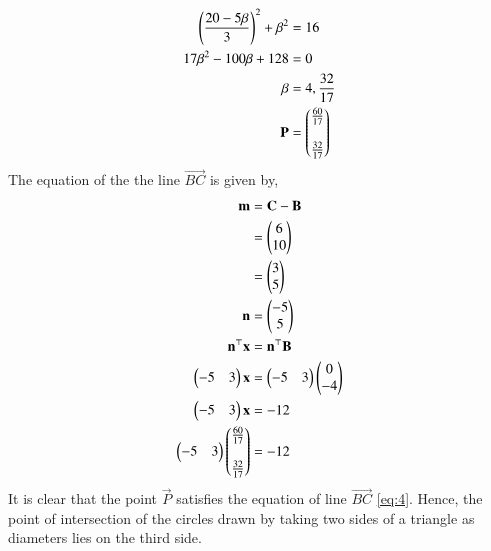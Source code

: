 \documentclass[journal,12pt,twocolumn]{IEEEtran}
\begin{document}
\begin{enumerate}
\begin{align}
\left(\frac{20-5\beta}{3}\right)^2 + \beta^2 &= 16\\
17\beta^2-100\beta+128 &= 0\\
\beta &= 4, \frac{32}{17}\\
\mathbf{P} &= \begin{pmatrix}\frac{60}{17}\\\\\frac{32}{17}\end{pmatrix}
\end{align}
The equation of the the line $\vec{BC}$ is given by,
\begin{align}
\mathbf{m} &= \mathbf{C}-\mathbf{B}\\
&= \begin{pmatrix}6\\10\end{pmatrix}\\
&= \begin{pmatrix}3\\5\end{pmatrix}\\
\mathbf{n} &= \begin{pmatrix}-5\\5\end{pmatrix}\\
\mathbf{n}^\top\mathbf{x} &= \mathbf{n}^\top\mathbf{B}\\
\begin{pmatrix}-5&3\end{pmatrix}\mathbf{x} &= \begin{pmatrix}-5&3\end{pmatrix}\begin{pmatrix}0\\-4\end{pmatrix}\\
\begin{pmatrix}-5&3\end{pmatrix}\mathbf{x} &= -12
\label{eq:4}\\
\begin{pmatrix}-5&3\end{pmatrix}\begin{pmatrix}\frac{60}{17}\\\\\frac{32}{17}\end{pmatrix} &= -12
\end{align}
It is clear that the point $\vec{P}$ satisfies the equation of line $\vec{BC}$ \eqref{eq:4}. Hence, the point of intersection of the circles drawn by taking two sides of a triangle as diameters lies on the third side.
\end{enumerate}
\end{document}

